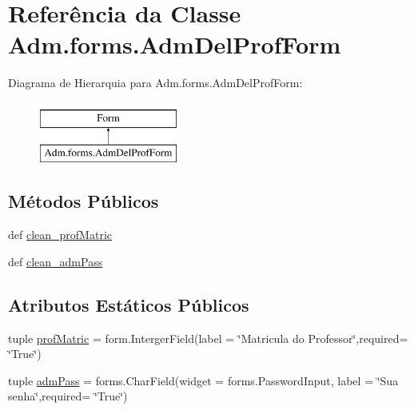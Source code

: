 \hypertarget{classAdm_1_1forms_1_1AdmDelProfForm}{\section{Referência da Classe Adm.\-forms.\-Adm\-Del\-Prof\-Form}
\label{classAdm_1_1forms_1_1AdmDelProfForm}
}
Diagrama de Hierarquia para Adm.\-forms.\-Adm\-Del\-Prof\-Form\-:\begin{figure}[H]
\begin{center}
\leavevmode
\includegraphics[height=2.000000cm]{dd/d81/classAdm_1_1forms_1_1AdmDelProfForm}
\end{center}
\end{figure}
\subsection*{Métodos Públicos}
\begin{DoxyCompactItemize}
\item 
def \hyperlink{classAdm_1_1forms_1_1AdmDelProfForm_aad92572be5ea398d700b331c79cc608e}{clean\-\_\-prof\-Matric}
\item 
def \hyperlink{classAdm_1_1forms_1_1AdmDelProfForm_a80ed7e862c1d77fa2fc83134692304aa}{clean\-\_\-adm\-Pass}
\end{DoxyCompactItemize}
\subsection*{Atributos Estáticos Públicos}
\begin{DoxyCompactItemize}
\item 
tuple \hyperlink{classAdm_1_1forms_1_1AdmDelProfForm_a3b53155ed7b63a0ad994c47305061ca1}{prof\-Matric} = form.\-Interger\-Field(label = \char`\"{}Matricula do Professor\char`\"{},required= \char`\"{}True\char`\"{})
\item 
tuple \hyperlink{classAdm_1_1forms_1_1AdmDelProfForm_a5c75c479d2d63fb207af1fd9eb1d85ad}{adm\-Pass} = forms.\-Char\-Field(widget = forms.\-Password\-Input, label = \char`\"{}Sua senha\char`\"{},required= \char`\"{}True\char`\"{})
\end{DoxyCompactItemize}


